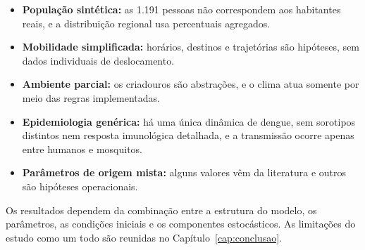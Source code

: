 \begin{itemize}
    \item \textbf{População sintética:} as 1.191 pessoas não correspondem aos habitantes reais, e a distribuição regional usa percentuais agregados.
    \item \textbf{Mobilidade simplificada:} horários, destinos e trajetórias são hipóteses, sem dados individuais de deslocamento.
    \item \textbf{Ambiente parcial:} os criadouros são abstrações, e o clima atua somente por meio das regras implementadas.
    \item \textbf{Epidemiologia genérica:} há uma única dinâmica de dengue, sem sorotipos distintos nem resposta imunológica detalhada, e a transmissão ocorre apenas entre humanos e mosquitos.
    \item \textbf{Parâmetros de origem mista:} alguns valores vêm da literatura e outros são hipóteses operacionais.
\end{itemize}

Os resultados dependem da combinação entre a estrutura do modelo, os parâmetros, as condições iniciais e os componentes estocásticos. As limitações do estudo como um todo são reunidas no Capítulo~\ref{cap:conclusao}.